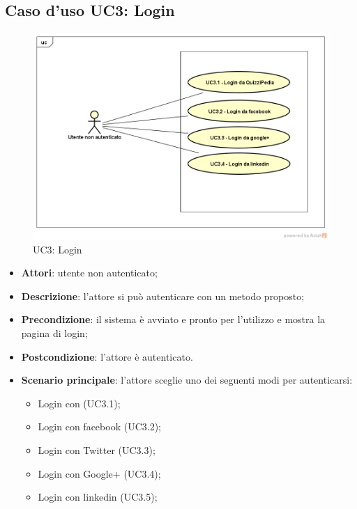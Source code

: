 \subsection{Caso d'uso UC3: Login}
\label{UC3}
\begin{figure}
	\centering
	\includegraphics[scale=0.5]{UML/UC3.png}
	\caption{UC3: Login}
\end{figure}
\FloatBarrier
\begin{itemize}
	\item \textbf{Attori}: utente non autenticato;
	\item \textbf{Descrizione}: l'attore si può autenticare con un metodo proposto;
	\item \textbf{Precondizione}: il sistema è avviato e pronto per l'utilizzo e mostra la pagina di login;
	\item \textbf{Postcondizione}: l'attore è autenticato.
	\item \textbf{Scenario principale}: l'attore sceglie uno dei seguenti modi per autenticarsi:
		\begin{itemize}
			\item Login con \progetto (UC3.1);
			\item Login con facebook (UC3.2);
			\item Login con Twitter (UC3.3);
			\item Login con Google+ (UC3.4);
			\item Login con linkedin (UC3.5);
		\end{itemize}
\end{itemize}
